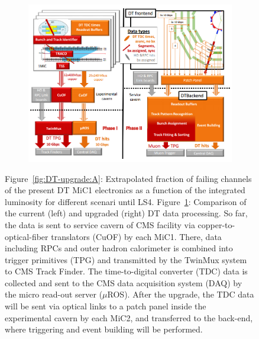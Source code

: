 \begin{figure}[H]
\begin{subfigure}{\linewidth}
		\end{subfigure}
		\begin{subfigure}{\linewidth}
			\centering
			\includegraphics[width=0.9\plotwidth]{fig/chapt3/DT-upgrade.png}
			\caption{\label{fig:DT-upgrade:B}}
		\end{subfigure}
		\caption{\label{fig:DT-upgrade} Figure~\ref{fig:DT-upgrade:A}: Extrapolated fraction of failing channels of the present DT MiC1 electronics as a function of the integrated luminosity for different scenari until LS4. Figure~\ref{fig:DT-upgrade:B}: Comparison of the current (left) and upgraded (right) DT data processing. So far, the data is sent to service cavern of CMS facility via copper-to-optical-fiber translators (CuOF) by each MiC1. There, data including RPCs and outer hadron calorimeter is combined into trigger primitives (TPG) and transmitted by the TwinMux system to CMS Track Finder. The time-to-digital converter (TDC) data is collected and sent to the CMS data acquisition system (DAQ) by the micro read-out server ($\mu$ROS). After the upgrade, the TDC data will be sent via optical links to a patch panel inside the experimental cavern by each MiC2, and transferred to the back-end, where triggering and event building will be performed.}
	\end{figure}
	
